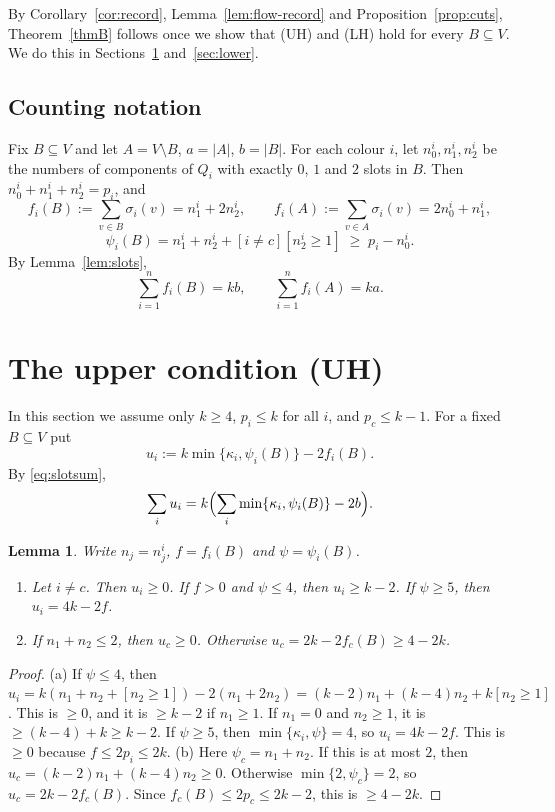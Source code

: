\documentclass[11pt]{amsart}
\newtheorem{lemma}[theorem]{Lemma}
\theoremstyle{definition}
\theoremstyle{remark}
\begin{document}
By Corollary~\ref{cor:record}, Lemma~\ref{lem:flow-record} and
Proposition~\ref{prop:cuts}, Theorem~\ref{thmB} follows once we show that (UH) and (LH) hold
for every $B\subseteq V$. We do this in Sections~\ref{sec:upper} and~\ref{sec:lower}.

\subsection*{Counting notation}
Fix $B\subseteq V$ and let $A=V\setminus B$, $a=|A|$, $b=|B|$. For each colour $i$, let
$n_0^i,n_1^i,n_2^i$ be the numbers of components of $Q_i$ with exactly $0$, $1$ and $2$ slots
in $B$. Then $n_0^i+n_1^i+n_2^i=p_i$, and
\[
f_i(B):=\sum_{v\in B}\sigma_i(v)=n_1^i+2n_2^i,\qquad f_i(A):=\sum_{v\in A}\sigma_i(v)=2n_0^i+n_1^i,
\]
\[
\psi_i(B)=n_1^i+n_2^i+[i\ne c][n_2^i\ge1]\;\ge\;p_i-n_0^i .
\]
By Lemma~\ref{lem:slots},
\begin{equation}\label{eq:slotsum}
\sum_{i=1}^n f_i(B)=kb,\qquad \sum_{i=1}^n f_i(A)=ka .
\end{equation}

\section{The upper condition (UH)}\label{sec:upper}

In this section we assume only $k\ge4$, $p_i\le k$ for all $i$, and $p_c\le k-1$. For a fixed
$B\subseteq V$ put
\[
u_i:=k\min\{\kappa_i,\psi_i(B)\}-2f_i(B).
\]
By \eqref{eq:slotsum},
\[
\sum_{i}u_i=k\Bigl(\sum_i\min\{\kappa_i,\psi_i(B)\}-2b\Bigr).
\]

\begin{lemma}\label{lem:u}
Write $n_j=n_j^i$, $f=f_i(B)$ and $\psi=\psi_i(B)$.
\begin{enumerate}[label=\textup{(\alph*)},leftmargin=*]
\item Let $i\ne c$. Then $u_i\ge0$. If $f>0$ and $\psi\le4$, then $u_i\ge k-2$. If $\psi\ge5$,
then $u_i=4k-2f$.
\item If $n_1+n_2\le2$, then $u_c\ge0$. Otherwise $u_c=2k-2f_c(B)\ge 4-2k$.
\end{enumerate}
\end{lemma}

\begin{proof}
(a) If $\psi\le4$, then
$u_i=k(n_1+n_2+[n_2\ge1])-2(n_1+2n_2)=(k-2)n_1+(k-4)n_2+k[n_2\ge1]$.
This is $\ge0$, and it is $\ge k-2$ if $n_1\ge1$. If $n_1=0$ and $n_2\ge1$, it is
$\ge (k-4)+k\ge k-2$. If $\psi\ge5$, then $\min\{\kappa_i,\psi\}=4$, so $u_i=4k-2f$. This is
$\ge0$ because $f\le 2p_i\le 2k$.
(b) Here $\psi_c=n_1+n_2$. If this is at most $2$, then $u_c=(k-2)n_1+(k-4)n_2\ge0$. Otherwise
$\min\{2,\psi_c\}=2$, so $u_c=2k-2f_c(B)$. Since $f_c(B)\le2p_c\le2k-2$, this is $\ge 4-2k$.
\end{proof}
\end{document}
